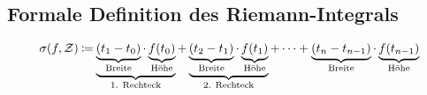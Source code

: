 \documentclass[../../main.tex]{subfiles}
\begin{document}
\subsection{Formale Definition des Riemann-Integrals}
\label{riemannintegral-richtig}
\[\sigma(f,\mathcal{Z})\mathbin{\coloneqq} \underbrace{\underbrace{(t_1-t_0)}_{\text{Breite}}\cdot \underbrace{f(t_0)}_{\text{Höhe}}}_{\text{1. Rechteck}}+\underbrace{\underbrace{(t_2-t_1)}_{\text{Breite}}\cdot \underbrace{f(t_1)}_{\text{Höhe}}}_{\text{2. Rechteck}}+\dots+\underbrace{(t_n-t_{n-1})}_{\text{Breite}}\cdot \underbrace{f(t_{n-1})}_{\text{Höhe}}\]    
\end{document}
